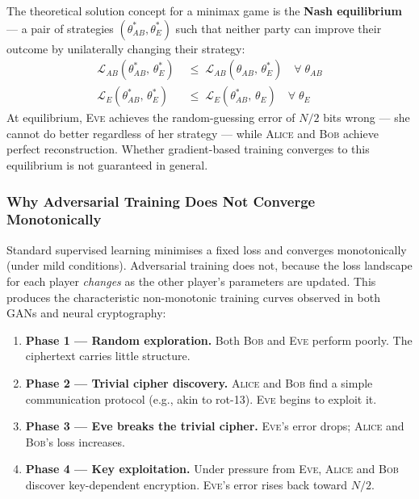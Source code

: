 \documentclass[12pt, a4paper]{article}
\newcommand{\alice}{\textsc{Alice}}
\newcommand{\bob}{\textsc{Bob}}
\newcommand{\eve}{\textsc{Eve}}
\begin{document}
The theoretical solution concept for a minimax game is the
\textbf{Nash equilibrium} — a pair of strategies $(\theta^*_{\!AB},
\theta^*_{\!E})$ such that neither party can improve their outcome by
unilaterally changing their strategy:
%
\begin{align}
  \mathcal{L}_{AB}(\theta^*_{\!AB},\, \theta^*_{\!E})
    &\;\leq\; \mathcal{L}_{AB}(\theta_{AB},\, \theta^*_{\!E})
    \quad \forall\; \theta_{AB}
    \label{eq:nash_ab} \\[4pt]
  \mathcal{L}_{E}(\theta^*_{\!AB},\, \theta^*_{\!E})
    &\;\leq\; \mathcal{L}_{E}(\theta^*_{\!AB},\, \theta_E)
    \quad \forall\; \theta_E
    \label{eq:nash_e}
\end{align}
%
At equilibrium, \eve{} achieves the random-guessing error of $N/2$ bits
wrong — she cannot do better regardless of her strategy — while \alice{}
and \bob{} achieve perfect reconstruction. Whether gradient-based
training converges to this equilibrium is not guaranteed in general.

\subsubsection*{Why Adversarial Training Does Not Converge Monotonically}

Standard supervised learning minimises a fixed loss and converges
monotonically (under mild conditions). Adversarial training does not,
because the loss landscape for each player \emph{changes} as the other
player's parameters are updated. This produces the characteristic
non-monotonic training curves observed in both GANs and neural
cryptography:

\begin{enumerate}[leftmargin=2em, itemsep=4pt]
  \item \textbf{Phase 1 — Random exploration.} Both \bob{} and \eve{}
        perform poorly. The ciphertext carries little structure.
  \item \textbf{Phase 2 — Trivial cipher discovery.} \alice{} and \bob{}
        find a simple communication protocol (e.g., akin to rot-13).
        \eve{} begins to exploit it.
  \item \textbf{Phase 3 — Eve breaks the trivial cipher.} \eve{}'s error
        drops; \alice{} and \bob{}'s loss increases.
  \item \textbf{Phase 4 — Key exploitation.} Under pressure from \eve{},
        \alice{} and \bob{} discover key-dependent encryption. \eve{}'s
        error rises back toward $N/2$.
\end{enumerate}
\end{document}

